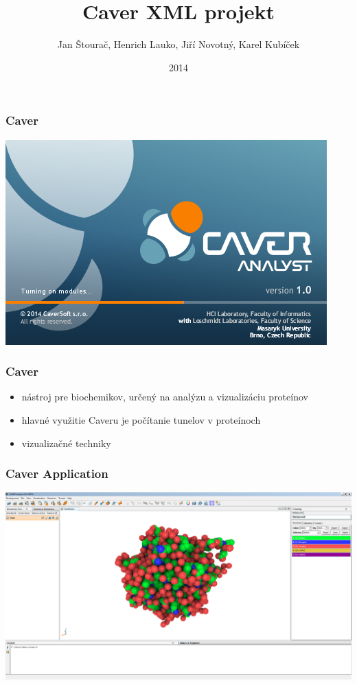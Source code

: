 \documentclass[slovak]{beamer}
\title{Caver XML projekt}
\date{2014}
\author{
	Jan Štourač, Henrich Lauko, Jiří Novotný, Karel Kubíček
}
\begin{document}
\begin{frame}
	\titlepage
\end{frame}

\begin{frame}
\frametitle{Caver}
	\includegraphics[width=\linewidth]{caver_start.jpg}
\end{frame}

\begin{frame}
\frametitle{Caver}
	\begin{itemize}
		\item nástroj pre biochemikov, určený na analýzu a vizualizáciu proteínov
		\item hlavné využitie Caveru je počítanie tunelov v proteínoch
		\item vizualizačné techniky
	\end{itemize}
\end{frame}

\begin{frame}
\frametitle{Caver Application}
	\begin{center}
		\includegraphics[width=\linewidth]{caver.png}
	\end{center}
\end{frame}
\end{document}
